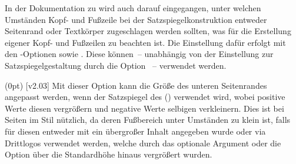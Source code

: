 \begin{DeclareEntity*}{}
\begin{DeclareEntity*}{}
\begin{DeclareEntity*}{}
In der Dokumentation zu  wird auch darauf eingegangen, unter 
welchen Umständen Kopf- und Fußzeile bei der Satzspiegelkonstruktion entweder 
Seitenrand oder Textkörper zugeschlagen werden sollten, was für die Erstellung 
eigener Kopf- und Fußzeilen zu beachten ist. Die Einstellung dafür erfolgt mit 
den \KOMAScript-Optionen  
sowie . Diese können~-- 
unabhängig von der Einstellung zur Satzspiegelgestaltung durch die Option 
~-- verwendet werden.

\begin{Declaration}
  {}
  (0pt)
  [v2.03]
\printdeclarationlist
%
Mit dieser Option kann die Größe des unteren Seitenrandes angepasst werden, 
wenn der Satzspiegel des \CDs () 
verwendet wird, wobei positive Werte diesen vergrößern und negative Werte 
selbigen verkleinern. Dies ist bei Seiten im Stil  
nützlich, da deren Fußbereich unter Umständen zu klein ist, falls für diesen 
entweder mit  ein übergroßer Inhalt angegeben wurde oder via 
 Drittlogos verwendet werden, welche durch das optionale 
Argument oder die Option  über die Standardhöhe hinaus 
vergrößert wurden. 
%
\end{Declaration}




\end{DeclareEntity*}
\end{DeclareEntity*}
\end{DeclareEntity*}
